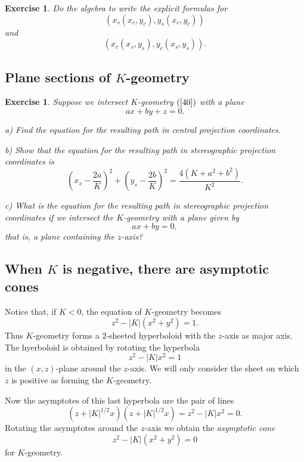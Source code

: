 \documentclass{article}%
\newtheorem{exercise}[theorem]{Exercise}
\begin{document}
\begin{exercise}
Do the algebra to write the explicit formulas for%
\[
\left(  x_{s}\left(  x_{c},y_{c}\right)  ,y_{s}\left(  x_{c},y_{c}\right)
\right)
\]
and%
\[
\left(  x_{c}\left(  x_{s},y_{s}\right)  ,y_{c}\left(  x_{s},y_{s}\right)
\right)  .
\]
\pagebreak
\end{exercise}

\subsection{Plane sections of $K$-geometry}

\begin{exercise}
\label{73}Suppose we intersect $K$-geometry $\left(  \ref{40}\right)  $ with a
plane%
\[
ax+by+z=0.
\]


a) Find the equation for the resulting path in central projection coordinates.

b) Show that the equation for the resulting path in stereographic projection
coordinates is%
\[
\left(  x_{s}-\frac{2a}{K}\right)  ^{2}+\left(  y_{s}-\frac{2b}{K}\right)
^{2}=\frac{4\left(  K+a^{2}+b^{2}\right)  }{K^{2}}.
\]


c) What is the equation for the resulting path in stereographic projection
coordinates if we intersect the $K$-geometry with a plane given by%
\[
ax+by=0,
\]
that is, a plane containing the $z$-axis?\pagebreak
\end{exercise}

\subsection{When $K$ is negative, there are asymptotic cones}

Notice that, if $K<0$, the equation of $K$-geometry becomes%
\[
z^{2}-\left\vert K\right\vert \left(  x^{2}+y^{2}\right)  =1.
\]
Thus $K$-geometry forms a $2$-sheeted hyperboloid with the $z$-axis as major
axis. The hyerboloid is obtained by rotating the hyperbola%
\begin{equation}
z^{2}-\left\vert K\right\vert x^{2}=1 \label{hyp}%
\end{equation}
in the $\left(  x,z\right)  $-plane around the $z$-axis. We will only consider
the sheet on which $z$ is positive as forming the $K$-geometry.

Now the asymptotes of this last hyperbola are the pair of lines%
\[
\left(  z+\left\vert K\right\vert ^{1/2}x\right)  \left(  z+\left\vert
K\right\vert ^{1/2}x\right)  =z^{2}-\left\vert K\right\vert x^{2}=0.
\]
Rotating the asymptotes around the $z$-axis we obtain the \textit{asymptotic
cone}%
\[
z^{2}-\left\vert K\right\vert \left(  x^{2}+y^{2}\right)  =0
\]
for $K$-geometry.
\end{document}
